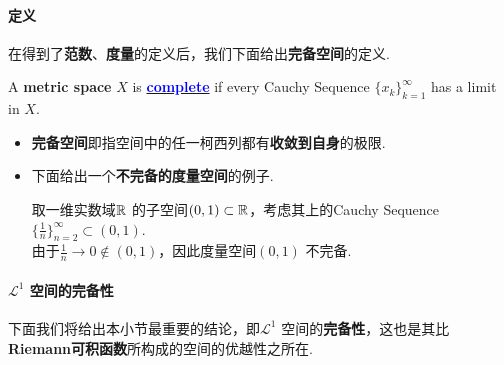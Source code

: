 \paragraph{定义}
	在得到了\textbf{范数}、\textbf{度量}的定义后，我们下面给出\textbf{完备空间}的定义.
	\begin{defn}\label{def 3.2.5}
		A \textbf{metric space} $X$ is \underline{\textcolor{blue}{\textbf{complete}}} if every Cauchy Sequence $\{ x_k \}_{k = 1}^{\infty}$ has a limit in $X$.
		
		\vspace{2em}
		\begin{rmk}
			\begin{itemize}
				\item \textbf{完备空间}即指空间中的任一柯西列都有\textbf{收敛到自身}的极限.
				
				\vspace{1em}
				
				\item 下面给出一个\textbf{不完备的度量空间}的例子.
				\begin{example}\label{ex 3.2.1}
					取一维实数域$\mathbb{R}$ 的子空间$(0 , 1) \subset \mathbb{R}$，考虑其上的Cauchy Sequence $\{ \frac{1}{n} \}_{n = 2}^{\infty} \subset (0 , 1)$.\\
					由于$\frac{1}{n} \to 0 \notin (0 , 1)$，因此度量空间$(0 , 1)$ 不完备.
				\end{example}
			\end{itemize}
		\end{rmk}
	\end{defn}

\vspace{2em}
\paragraph{\textbf{$\mathcal{L}^1$ 空间的完备性}}
	下面我们将给出本小节最重要的结论，即$\mathcal{L}^1$ 空间的\textbf{完备性}，这也是其比\textbf{Riemann可积函数}所构成的空间的优越性之所在.
	
